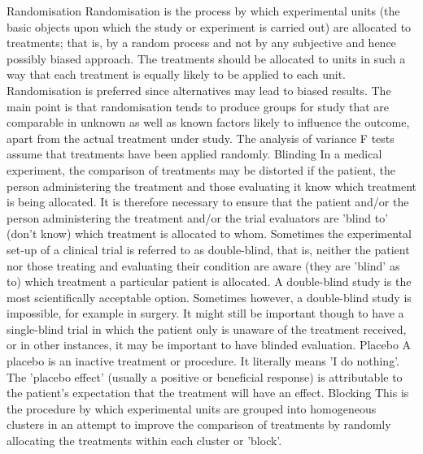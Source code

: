 \begin{itemize}
Randomisation 
Randomisation is the process by which experimental units (the basic objects upon which the study or experiment is carried out) are allocated to treatments; that is, by a random process and not by any subjective and hence possibly biased approach. The treatments should be allocated to units in such a way that each treatment is equally likely to be applied to each unit.
Randomisation is preferred since alternatives may lead to biased results.
The main point is that randomisation tends to produce groups for study that are comparable in unknown as well as known factors likely to influence the outcome, apart from the actual treatment under study. The analysis of variance F tests assume that treatments have been applied randomly.
Blinding 
In a medical experiment, the comparison of treatments may be distorted if the patient, the person administering the treatment and those evaluating it know which treatment is being allocated. It is therefore necessary to ensure that the patient and/or the person administering the treatment and/or the trial evaluators are 'blind to' (don't know) which treatment is allocated to whom.
Sometimes the experimental set-up of a clinical trial is referred to as double-blind, that is, neither the patient nor those treating and evaluating their condition are aware (they are 'blind' as to) which treatment a particular patient is allocated. A double-blind study is the most scientifically acceptable option.
Sometimes however, a double-blind study is impossible, for example in surgery. It might still be important though to have a single-blind trial in which the patient only is unaware of the treatment received, or in other instances, it may be important to have blinded evaluation.
Placebo 
A placebo is an inactive treatment or procedure. It literally means 'I do nothing'. The 'placebo effect' (usually a positive or beneficial response) is attributable to the patient's expectation that the treatment will have an effect.
Blocking 
This is the procedure by which experimental units are grouped into homogeneous clusters in an attempt to improve the comparison of treatments by randomly allocating the treatments within each cluster or 'block'.


\end{itemize}
